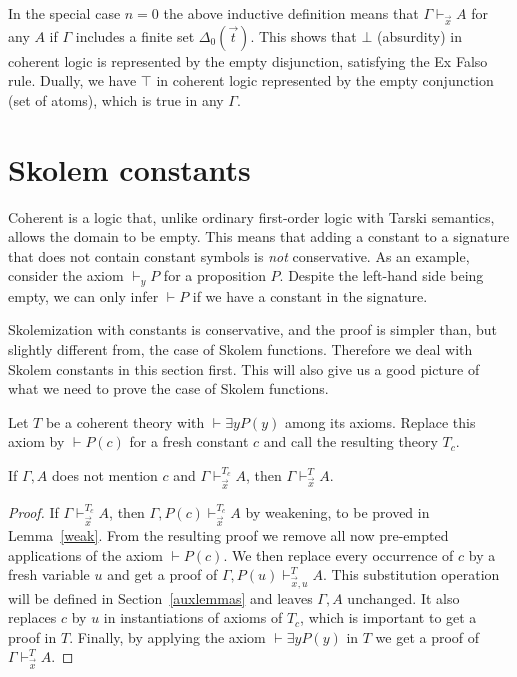 \documentclass[10pt,a4paper]{article}
\begin{document}
In the special case $n=0$ the above inductive definition
means that $\Gamma\vdash_{\vec{x}} A$ for any $A$ if $\Gamma$
includes a finite set $\Delta_0(\vec{t})$. This shows that $\bot$ (absurdity) in coherent logic
is represented by the empty disjunction, satisfying the Ex Falso rule. Dually, we have $\top$
in coherent logic represented by  the empty conjunction (set of atoms), 
which is true in any $\Gamma$.

\section{Skolem constants}\label{sec:skolemconstant}

Coherent is a logic that, unlike ordinary first-order logic with Tarski semantics,
allows the domain to be empty. This means that adding a constant to a signature
that does not contain constant symbols is \emph{not} conservative.
As an example, consider the axiom $\vdash_{y} P$ for a proposition $P$.
Despite the left-hand side being empty,
we can only infer $\vdash P$ if we have a constant in the signature.

Skolemization with constants is conservative, and the proof is simpler than,
but slightly different from, the case of Skolem functions.
Therefore we deal with Skolem constants in this section first.
This will also give us a good picture of what we need to prove
the case of Skolem functions.

Let $T$ be a coherent theory with $\vdash\exists y P(y)$ among its axioms.
Replace this axiom by $\vdash P(c)$ for a fresh constant $c$
and call the resulting theory $T_c$. 

\begin{theorem}
If $\Gamma,A$ does not mention $c$ and $\Gamma\vdash_{\vec{x}}^{T_c} A$, then
$\Gamma\vdash_{\vec{x}}^{T} A$.
\end{theorem}

\begin{proof}
If $\Gamma\vdash_{\vec{x}}^{T_c} A$, then $\Gamma,P(c)\vdash_{\vec{x}}^{T_c} A$
by weakening, to be proved in Lemma~\ref{weak}.
From the resulting proof we remove all now pre-empted applications of
the axiom $\vdash P(c)$. We then
replace every occurrence of $c$ by a fresh variable $u$ and 
get a proof of $\Gamma,P(u)\vdash_{\vec{x},u}^{T} A$.
This substitution operation will be defined in Section~\ref{auxlemmas}
and leaves $\Gamma,A$ unchanged.
It also replaces $c$ by $u$ in instantiations of axioms of $T_c$,
which is important to get a proof in $T$. Finally,
by applying the axiom $\vdash\exists y P(y)$ in $T$ 
we get a proof of $\Gamma\vdash_{\vec{x}}^{T} A$.
\end{proof}
\end{document}
